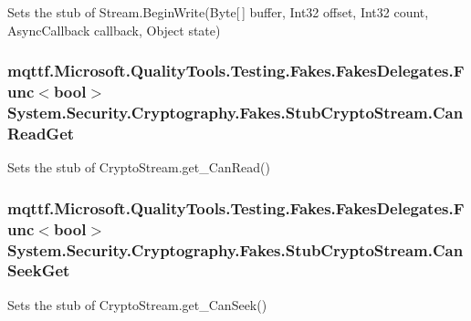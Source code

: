 Sets the stub of Stream.\-Begin\-Write(\-Byte\mbox{[}$\,$\mbox{]} buffer, Int32 offset, Int32 count, Async\-Callback callback, Object state)

\hypertarget{class_system_1_1_security_1_1_cryptography_1_1_fakes_1_1_stub_crypto_stream_af3d08df26b742d88e31a15ffef49ceee}{
\subsubsection[{Can\-Read\-Get}]{\setlength{\rightskip}{0pt plus 5cm}mqttf.\-Microsoft.\-Quality\-Tools.\-Testing.\-Fakes.\-Fakes\-Delegates.\-Func$<$bool$>$ System.\-Security.\-Cryptography.\-Fakes.\-Stub\-Crypto\-Stream.\-Can\-Read\-Get}}\label{class_system_1_1_security_1_1_cryptography_1_1_fakes_1_1_stub_crypto_stream_af3d08df26b742d88e31a15ffef49ceee}


Sets the stub of Crypto\-Stream.\-get\-\_\-\-Can\-Read()

\hypertarget{class_system_1_1_security_1_1_cryptography_1_1_fakes_1_1_stub_crypto_stream_a05d3e8d2774bfa618801463593cf801b}{
\subsubsection[{Can\-Seek\-Get}]{\setlength{\rightskip}{0pt plus 5cm}mqttf.\-Microsoft.\-Quality\-Tools.\-Testing.\-Fakes.\-Fakes\-Delegates.\-Func$<$bool$>$ System.\-Security.\-Cryptography.\-Fakes.\-Stub\-Crypto\-Stream.\-Can\-Seek\-Get}}\label{class_system_1_1_security_1_1_cryptography_1_1_fakes_1_1_stub_crypto_stream_a05d3e8d2774bfa618801463593cf801b}


Sets the stub of Crypto\-Stream.\-get\-\_\-\-Can\-Seek()


